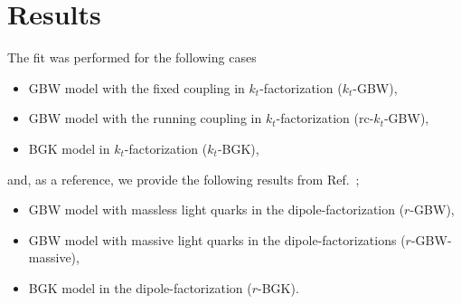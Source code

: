 \documentclass[12pt]{article}
\numberwithin{equation}{section}
\numberwithin{table}{section}
\numberwithin{figure}{section}
\begin{document}
%
\section{Results}
\label{Results}
%
The fit was performed for the following cases
\begin{itemize}
\item GBW model with the fixed coupling in $k_t$-factorization  ($k_t$-GBW),
\item GBW model with the running coupling in $k_t$-factorization (rc-$k_t$-GBW),
\item BGK model in $k_t$-factorization ($k_t$-BGK),
\end{itemize} 
and, as a reference, we provide the following results from Ref.~\cite{Goda:2022wsc};
\begin{itemize}
\item GBW model with massless light quarks in the dipole-factorization ($r$-GBW),
\item GBW model with massive light quarks in the dipole-factorizations ($r$-GBW-massive),
\item  BGK model in  the dipole-factorization ($r$-BGK).
\end{itemize} 
\end{document}

